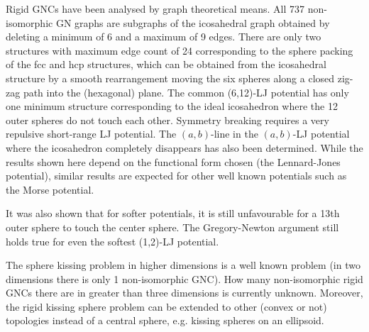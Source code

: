 Rigid \acp{GNC} have been analysed by graph theoretical means. All 737
non-isomorphic \ac{GN} graphs are subgraphs of the icosahedral graph obtained by
deleting a minimum of 6 and a maximum of 9 edges. There are only two structures
with maximum edge count of 24 corresponding to the sphere packing of the
\ac{fcc} and \ac{hcp} structures, which can be obtained from the icosahedral
structure by a smooth rearrangement moving the six spheres along a closed
zig-zag path into the (hexagonal) plane. The common (6,12)-\ac{LJ} potential has
only one minimum structure corresponding to the ideal icosahedron where the 12
outer spheres do not touch each other. Symmetry breaking requires a very
repulsive short-range LJ potential. The $(a,b)$-line in the $(a,b)$-\ac{LJ}
potential where the icosahedron completely disappears has also been determined.
While the results shown here depend on the functional form chosen (the
Lennard-Jones potential), similar results are expected for other well known
potentials such as the Morse potential.

It was also shown that for softer potentials, it is still unfavourable for a
13th outer sphere to touch the center sphere. The Gregory-Newton argument still
holds true for even the softest (1,2)-\ac{LJ} potential.

The sphere kissing problem in higher dimensions is a well known
problem\autocite{Conway_SpherePackingsLattices_1999} (in two dimensions there is
only 1 non-isomorphic \ac{GNC}). How many non-isomorphic rigid GNCs there are in
greater than three dimensions is currently unknown. Moreover, the rigid kissing
sphere problem can be extended to other (convex or not) topologies instead of a
central sphere, e.g. kissing spheres on an ellipsoid.

